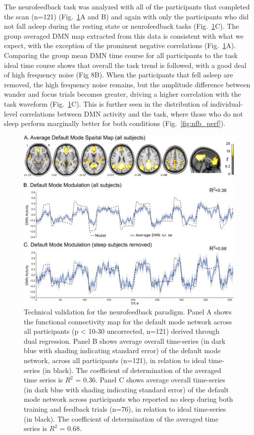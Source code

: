 The neurofeedback task was analyzed with all of the participants that completed the scan (n=121) (Fig.~\ref{fig:nfb_plots}A and B) and again with only the participants who did not fall asleep during the resting state or neurofeedback tasks (Fig.~\ref{fig:nfb_plots}C). The group averaged DMN map extracted from this data is consistent with what we expect, with the exception of the prominent negative correlations (Fig.~\ref{fig:nfb_plots}A). Comparing the group mean DMN time course for all participants to the task ideal time course shows that overall the task trend is followed, with a good deal of high frequency noise (Fig 8B). When the participants that fell asleep are removed, the high frequency noise remains, but the amplitude difference between wander and focus trials becomes greater, driving a higher correlation with the task waveform (Fig.~\ref{fig:nfb_plots}C). This is further seen in the distribution of individual-level correlations between DMN activity and the task, where those who do not sleep perform marginally better for both conditions (Fig.~\ref{fig:nfb_perf}).

\begin{figure}[h!]
   \centering
   \includegraphics[width=.9\textwidth]{nfb_plots.png}
   \caption{Technical validation for the neurofeedback paradigm. Panel A shows the functional connectivity map for the default mode network across all participants (p < 10-30 uncorrected, n=121) derived through dual regression. Panel B shows average overall time-series (in dark blue with shading indicating standard error) of the default mode network, across all participants (n=121), in relation to ideal time-series (in black). The coefficient of determination of the averaged time series is $R^2$ = 0.36. Panel C shows average overall time-series (in dark blue with shading indicating standard error) of the default mode network across participants who reported no sleep during both training and feedback trials (n=76), in relation to ideal time-series (in black). The coefficient of determination of the averaged time series is $R^2$ = 0.68.}
   \label{fig:nfb_plots}
\end{figure}

